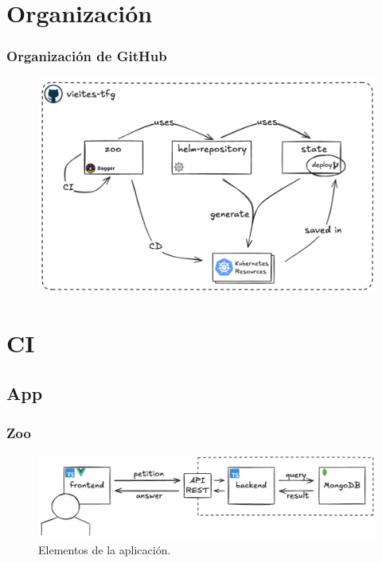 \documentclass{beamer}
\begin{document}
\section{Organización}
\begin{frame}
    \frametitle{Organización de GitHub}
    \begin{figure}
        \includegraphics[scale=0.28]{figuras/vieites-tfg}
    \end{figure}
\end{frame}

\section{CI}
\subsection{App}
\begin{frame}
    \frametitle{Zoo}
    \begin{figure}
        \includegraphics[scale=0.25]{figuras/app}
        \caption{Elementos de la aplicación.}
    \end{figure}
\end{frame}
\end{document}
